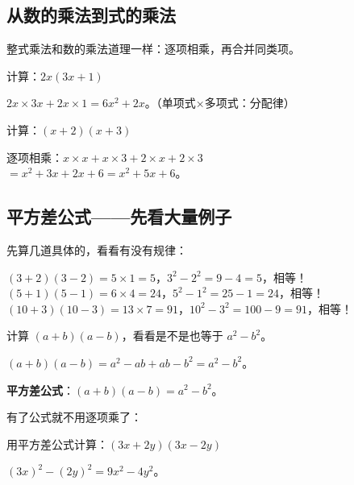 

\subsection*{从数的乘法到式的乘法}

整式乘法和数的乘法道理一样：逐项相乘，再合并同类项。

\begin{example}
计算：$2x(3x+1)$
\end{example}
\begin{solution}
$2x\times3x + 2x\times1 = 6x^2 + 2x$。（单项式×多项式：分配律）
\end{solution}

\begin{example}
计算：$(x+2)(x+3)$
\end{example}
\begin{solution}
逐项相乘：$x\times x + x\times3 + 2\times x + 2\times3$\\
$= x^2 + 3x + 2x + 6 = x^2 + 5x + 6$。
\end{solution}

\subsection*{平方差公式——先看大量例子}

先算几道具体的，看看有没有规律：

$(3+2)(3-2) = 5\times1 = 5$，$3^2-2^2 = 9-4 = 5$，相等！\\
$(5+1)(5-1) = 6\times4 = 24$，$5^2-1^2 = 25-1 = 24$，相等！\\
$(10+3)(10-3) = 13\times7 = 91$，$10^2-3^2 = 100-9 = 91$，相等！

\begin{example}
计算 $(a+b)(a-b)$，看看是不是也等于 $a^2-b^2$。
\end{example}
\begin{solution}
$(a+b)(a-b) = a^2 - ab + ab - b^2 = a^2 - b^2$。

\textbf{平方差公式}：$(a+b)(a-b) = a^2 - b^2$。
\end{solution}

有了公式就不用逐项乘了：

\begin{example}
用平方差公式计算：$(3x+2y)(3x-2y)$
\end{example}
\begin{solution}
$(3x)^2 - (2y)^2 = 9x^2 - 4y^2$。
\end{solution}


